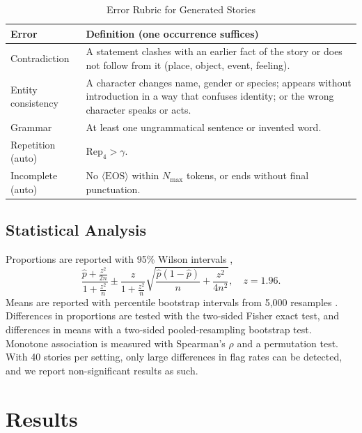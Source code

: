 \documentclass[journal]{IEEEtran}
\newcommand{\EOS}{\langle\mathrm{EOS}\rangle}
\begin{document}
\begin{table}[!t]
\centering
\caption{Error Rubric for Generated Stories}
\label{tab:rubric}
\begin{tabular}{@{}p{}p{}@{}}
\toprule
Error & Definition (one occurrence suffices) \\
\midrule
Contradiction & A statement clashes with an earlier fact of the story or does not follow from it (place, object, event, feeling). \\
Entity consistency & A character changes name, gender or species; appears without introduction in a way that confuses identity; or the wrong character speaks or acts. \\
Grammar & At least one ungrammatical sentence or invented word. \\
Repetition (auto) & $\mathrm{Rep}_4>\gamma$. \\
Incomplete (auto) & No $\EOS$ within $N_{\max}$ tokens, or ends without final punctuation. \\
\bottomrule
\end{tabular}
\end{table}

\subsection{Statistical Analysis}
Proportions are reported with 95\% Wilson intervals \cite{wilson1927probable},
\begin{equation}
\frac{\hat{p}+\frac{z^2}{2n}}{1+\frac{z^2}{n}} \pm \frac{z}{1+\frac{z^2}{n}}\sqrt{\frac{\hat{p}(1-\hat{p})}{n}+\frac{z^2}{4n^2}},\quad z=1.96.
\end{equation}
Means are reported with percentile bootstrap intervals from 5,000 resamples \cite{efron1993bootstrap}. Differences in proportions are tested with the two-sided Fisher exact test, and differences in means with a two-sided pooled-resampling bootstrap test. Monotone association is measured with Spearman's $\rho$ and a permutation test. With 40 stories per setting, only large differences in flag rates can be detected, and we report non-significant results as such.

\section{Results}
\label{sec:results}
\end{document}
